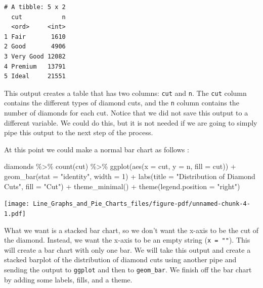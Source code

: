 \documentclass[
  letterpaper,
  DIV=11,
  numbers=noendperiod]{scrreprt}
\newenvironment{Shaded}{\begin{snugshade}}{\end{snugshade}}
\newcommand{\AttributeTok}[1]{\textcolor[rgb]{0.40,0.45,0.13}{#1}}
\newcommand{\DecValTok}[1]{\textcolor[rgb]{0.68,0.00,0.00}{#1}}
\newcommand{\FunctionTok}[1]{\textcolor[rgb]{0.28,0.35,0.67}{#1}}
\newcommand{\NormalTok}[1]{\textcolor[rgb]{0.00,0.23,0.31}{#1}}
\newcommand{\SpecialCharTok}[1]{\textcolor[rgb]{0.37,0.37,0.37}{#1}}
\newcommand{\StringTok}[1]{\textcolor[rgb]{0.13,0.47,0.30}{#1}}
\begin{document}
\begin{verbatim}
# A tibble: 5 x 2
  cut           n
  <ord>     <int>
1 Fair       1610
2 Good       4906
3 Very Good 12082
4 Premium   13791
5 Ideal     21551
\end{verbatim}

This output creates a table that has two columns: \texttt{cut} and
\texttt{n}. The \texttt{cut} column contains the different types of
diamond cuts, and the \texttt{n} column contains the number of diamonds
for each cut. Notice that we did not save this output to a different
variable. We could do this, but it is not needed if we are going to
simply pipe this output to the next step of the process.

At this point we could make a normal bar chart as follows :

\begin{Shaded}
\begin{Highlighting}[]
\NormalTok{diamonds }\SpecialCharTok{\%\textgreater{}\%}
  \FunctionTok{count}\NormalTok{(cut) }\SpecialCharTok{\%\textgreater{}\%}
  \FunctionTok{ggplot}\NormalTok{(}\FunctionTok{aes}\NormalTok{(}\AttributeTok{x =}\NormalTok{ cut, }\AttributeTok{y =}\NormalTok{ n, }\AttributeTok{fill =}\NormalTok{ cut)) }\SpecialCharTok{+}
  \FunctionTok{geom\_bar}\NormalTok{(}\AttributeTok{stat =} \StringTok{"identity"}\NormalTok{, }\AttributeTok{width =} \DecValTok{1}\NormalTok{) }\SpecialCharTok{+}
  \FunctionTok{labs}\NormalTok{(}\AttributeTok{title =} \StringTok{"Distribution of Diamond Cuts"}\NormalTok{,}
       \AttributeTok{fill =} \StringTok{"Cut"}\NormalTok{) }\SpecialCharTok{+}
  \FunctionTok{theme\_minimal}\NormalTok{() }\SpecialCharTok{+}
  \FunctionTok{theme}\NormalTok{(}\AttributeTok{legend.position =} \StringTok{"right"}\NormalTok{)}
\end{Highlighting}
\end{Shaded}

\texttt{[image: Line\_Graphs\_and\_Pie\_Charts\_files/figure-pdf/unnamed-chunk-4-1.pdf]}

What we want is a stacked bar chart, so we don't want the x-axis to be
the cut of the diamond. Instead, we want the x-axis to be an empty
string (\texttt{x\ =\ ""}). This will create a bar chart with only one
bar. We will take this output and create a stacked barplot of the
distribution of diamond cuts using another pipe and sending the output
to \texttt{ggplot} and then to \texttt{geom\_bar}. We finish off the bar
chart by adding some labels, fills, and a theme.
\end{document}
